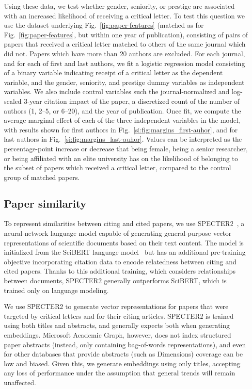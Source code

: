 \documentclass[12pt,a4paper]{article}
\numberwithin{equation}{section}
\begin{document}
Using these data, we test whether gender, seniority, or prestige are associated with an increased likelihood of receiving a critical letter. 
To test this question we use the dataset underlying Fig.~\ref*{fig:paper-features} (matched as for Fig.~\ref*{fig:paper-features}, but within one year of publication), consisting of pairs of papers that received a critical letter matched to others of the same journal which did not.
Papers which have more than 20 authors are excluded.
For each journal, and for each of first and last authors, we fit a logistic regression model consisting of a binary variable indicating receipt of a critical letter as the dependent variable, and the gender, seniority, and prestige dummy variables as independent variables. 
We also include control variables such the journal-normalized and log-scaled 3-year citation impact of the paper, a discretized count of the number of authors (1, 2--5, or 6--20), and the year of publication. 
Once fit, we compute the average marginal effect of each of the three independent variables in the model, with results shown for first authors in Fig.~\ref*{si:fig:margins_first-auhor}, and for last authors in Fig.~\ref*{si:fig:margins_last-auhor}. 
Values can be interpreted as the percentage-point increase or decrease that being female, being a senior researcher, or being affiliated with an elite university has on the likelihood of belonging to the subset of papers which received a critical letter, compared to the control group of matched papers.

\subsection*{Paper similarity}
To represent similarities between citing and cited papers, we use SPECTER2~\cite{Singh2022SciRepEvalAM, cohan-etal-2020-specter}, a neural-network language model capable of generating general-purpose vector representations of scientific documents based on their text content. 
The model is initialized from the SciBERT language model~\cite{beltagy-etal-2019-scibert} but has an additional pre-training objective incorporating citation data to encode relatedness between citing and cited papers.
Thanks to this additional training, which considers relationships between documents, SPECTER2 generally outperforms SciBERT, which is trained only on language modeling.

We use SPECTER2 to generate vector representations for papers that were targeted by critical letters and for their citing articles. 
SPECTER2 is trained using both titles and abstracts, and generally expects both when generating embeddings.
Microsoft Academic Graph, however, does not index structured paper abstracts (instead, only containing bag-of-words representations), and even for other databases that provide abstracts (such as Dimensions) coverage can be low and biased. 
Given this, we generate embeddings using only titles, accepting any loss of performance under the assumption that general trends will remain unaffected. 
\end{document}
